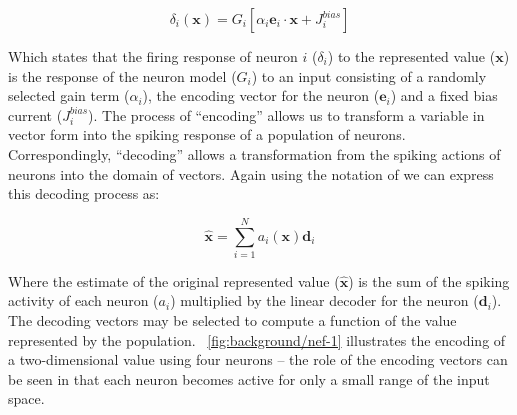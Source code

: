 \documentclass[conference]{IEEEtran}
\renewcommand{\vec}{\mathbf}  %
\begin{document}
\begin{equation}
  \delta_{i}\left(\vec{x}\right) = G_{i}\left[ \alpha_i \vec{e}_i \cdot \vec{x} + J^{bias}_i \right]
  \label{eq:encoding}
\end{equation}

Which states that the firing response of neuron $i$ ($\delta_i$) to the represented value ($\vec{x}$) is the response of the neuron model ($G_{i}$) to an input consisting of a randomly selected gain term ($\alpha_i$), the encoding vector for the neuron ($\vec{e}_i$) and a fixed bias current ($J^{bias}_i$).
The process of ``encoding'' allows us to transform a variable in vector form into the spiking response of a population of neurons.
Correspondingly, ``decoding'' allows a transformation from the spiking actions of neurons into the domain of vectors.
Again using the notation of \textcite{Stewart2014} we can express this decoding process as:

\begin{equation}
  \vec{\hat{x}} = \sum\limits_{i=1}^{N} a_i(\vec{x})\vec{d}_i  \label{eq:decoding}
\end{equation}

Where the estimate of the original represented value ($\vec{\hat{x}}$) is the sum of the spiking activity of each neuron ($a_i$) multiplied by the linear decoder for the neuron ($\vec{d}_i$).
The decoding vectors may be selected to compute a function of the value represented by the population.
\figurename~\ref{fig:background/nef-1} illustrates the encoding of a two-dimensional value using four neurons -- the role of the encoding vectors can be seen in that each neuron becomes active for only a small range of the input space.
\end{document}
